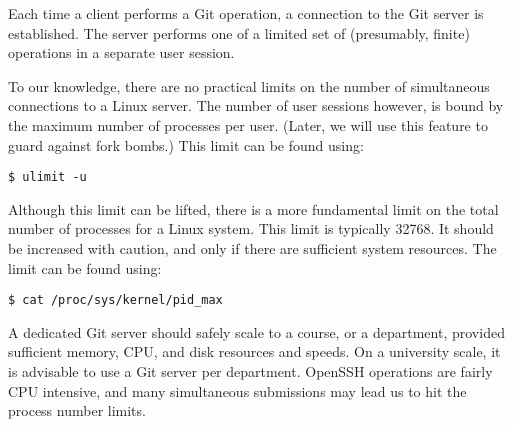 Each time a client performs a Git operation, a connection to the Git server is
established. The server performs one of a limited set of (presumably, finite)
operations in a separate user session.

To our knowledge, there are no practical limits on the number of simultaneous
connections to a Linux server. The number of user sessions however, is bound by
the maximum number of processes per user. (Later, we will use this feature to
guard against fork bombs.) This limit can be found using:

\begin{lstlisting}
$ ulimit -u
\end{lstlisting}

Although this limit can be lifted, there is a more fundamental limit on the
total number of processes for a Linux system. This limit is typically 32768. It
should be increased with caution, and only if there are sufficient system
resources. The limit can be found using:

\begin{lstlisting}
$ cat /proc/sys/kernel/pid_max
\end{lstlisting}

A dedicated Git server should safely scale to a course, or a department,
provided sufficient memory, CPU, and disk resources and speeds. On a university
scale, it is advisable to use a Git server per department. OpenSSH operations
are fairly CPU intensive, and many simultaneous submissions may lead us to hit
the process number limits.
